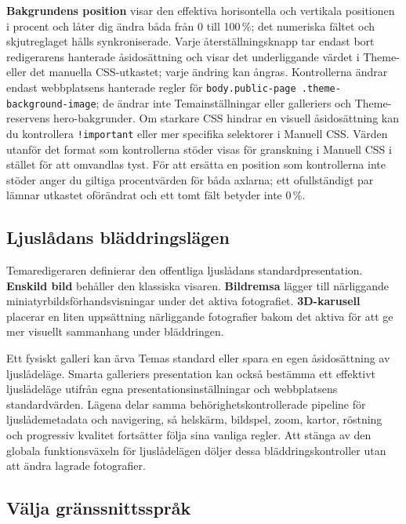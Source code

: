 \documentclass[11pt,a4paper]{article}
\newcommand{\ui}[1]{\textbf{#1}}
\newcommand{\codeword}[1]{\nolinkurl{#1}}
\begin{document}
\ui{Bakgrundens position} visar den effektiva horisontella och vertikala
positionen i procent och låter dig ändra båda från 0 till 100\,\%; det numeriska
fältet och skjutreglaget hålls synkroniserade. Varje återställningsknapp tar
endast bort redigerarens hanterade åsidosättning och visar det underliggande
värdet i Theme- eller det manuella CSS-utkastet; varje ändring kan ångras.
Kontrollerna ändrar endast webbplatsens hanterade regler för
\codeword{body.public-page .theme-background-image}; de ändrar inte
Temainställningar eller galleriers och Theme-reservens hero-bakgrunder. Om
starkare CSS hindrar en visuell åsidosättning kan du kontrollera
\codeword{!important} eller mer specifika selektorer i Manuell CSS. Värden
utanför det format som kontrollerna stöder visas för granskning i Manuell CSS i
stället för att omvandlas tyst. För att ersätta en position som kontrollerna
inte stöder anger du giltiga procentvärden för båda axlarna; ett ofullständigt
par lämnar utkastet oförändrat och ett tomt fält betyder inte 0\,\%.
\subsection{Ljuslådans bläddringslägen}

Temaredigeraren definierar den offentliga ljuslådans standardpresentation.
\ui{Enskild bild} behåller den klassiska visaren. \ui{Bildremsa} lägger till
närliggande miniatyrbildsförhandsvisningar under det aktiva fotografiet.
\ui{3D-karusell} placerar en liten uppsättning närliggande fotografier bakom det
aktiva för att ge mer visuellt sammanhang under bläddringen.

Ett fysiskt galleri kan ärva Temas standard eller spara en egen åsidosättning av
ljuslådeläge. Smarta galleriers presentation kan också bestämma ett effektivt
ljuslådeläge utifrån egna presentationsinställningar och webbplatsens
standardvärden. Lägena delar samma behörighetskontrollerade pipeline för
ljuslådemetadata och navigering, så helskärm, bildspel, zoom, kartor, röstning
och progressiv kvalitet fortsätter följa sina vanliga regler. Att stänga av den
globala funktionsväxeln för ljuslådelägen döljer dessa bläddringskontroller utan
att ändra lagrade fotografier.

\subsection{Välja gränssnittsspråk}
\label{sec:language-selection}
\end{document}
